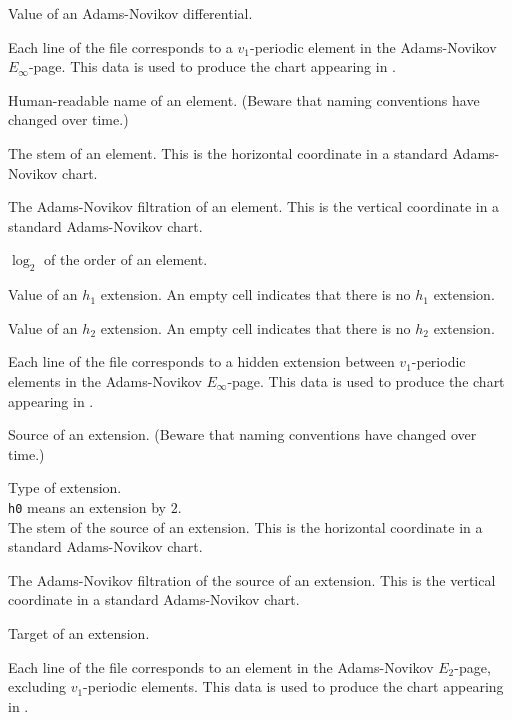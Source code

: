 \documentclass{amsart}
\begin{document}
Value of an Adams-Novikov differential.

\newpage

Each line of the file corresponds to a $v_1$-periodic element in the 
Adams-Novikov $E_\infty$-page.
This data is used to produce the chart appearing in
\cite{IWX19d}.

  Human-readable name of an element.
(Beware that naming conventions have changed over time.) 

 The stem of an element.  This is the
horizontal coordinate in a standard Adams-Novikov chart.

 The Adams-Novikov filtration of 
an element.  This is the vertical coordinate in a standard 
Adams-Novikov chart.

 $\log_2$ of the order of an element.

Value of an $h_1$ extension.  An empty cell indicates
that there is no $h_1$ extension.

Value of an $h_2$ extension.  An empty cell indicates
that there is no $h_2$ extension.

\newpage


Each line of the file corresponds to a hidden extension
between $v_1$-periodic elements in the
Adams-Novikov $E_\infty$-page.  This data is used to produce the
chart appearing in \cite{IWX19d}.

  Source of an extension.
(Beware that naming conventions have changed over time.)

 Type of extension. \\
\texttt{h0} means an extension by $2$. \\

 The stem of the source of an extension.  This is the
horizontal coordinate in a standard Adams-Novikov chart.

 The Adams-Novikov filtration of 
the source of an extension.  This is the vertical coordinate in a standard 
Adams-Novikov chart.

 Target of an extension.

\newpage

Each line of the file corresponds to an element in the
Adams-Novikov $E_2$-page, excluding $v_1$-periodic elements.
This data is used to produce the
chart appearing in \cite{IWX19d}.
\end{document}
